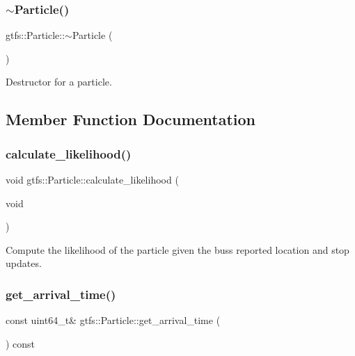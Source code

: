 \subsubsection{\texorpdfstring{$\sim$\+Particle()}{~Particle()}}
{\footnotesize\ttfamily gtfs\+::\+Particle\+::$\sim$\+Particle (\begin{DoxyParamCaption}{ }\end{DoxyParamCaption})}

Destructor for a particle. 

\subsection{Member Function Documentation}
\mbox{\label{classgtfs_1_1Particle_a88627efbe0eb2e289315ae82627d3a39}} 
\subsubsection{\texorpdfstring{calculate\+\_\+likelihood()}{calculate\_likelihood()}}
{\footnotesize\ttfamily void gtfs\+::\+Particle\+::calculate\+\_\+likelihood (\begin{DoxyParamCaption}\item[{void}]{ }\end{DoxyParamCaption})}

Compute the likelihood of the particle given the bus\textquotesingle{}s reported location and stop updates. \mbox{\label{classgtfs_1_1Particle_a783d1a0a614dc2c3f18cf269f69ede3d}} 
\subsubsection{\texorpdfstring{get\+\_\+arrival\+\_\+time()}{get\_arrival\_time()}}
{\footnotesize\ttfamily const uint64\+\_\+t\& gtfs\+::\+Particle\+::get\+\_\+arrival\+\_\+time (\begin{DoxyParamCaption}{ }\end{DoxyParamCaption}) const\hspace{0.3cm}{\ttfamily [inline]}}

